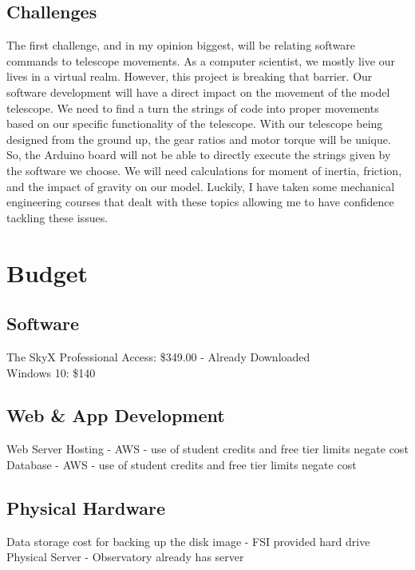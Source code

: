 \documentclass[12pt]{report}
\begin{document}
\clearpage

\subsection*{Challenges}

The first challenge, and in my opinion biggest, will be relating software commands to telescope movements. As a computer scientist, we mostly live our lives in a virtual realm. However, this project is breaking that barrier. Our software development will have a direct impact on the movement of the model telescope. We need to find a turn the strings of code into proper movements based on our specific functionality of the telescope. With our telescope being designed from the ground up, the gear ratios and motor torque will be unique. So, the Arduino board will not be able to directly execute the strings given by the software we choose. We will need calculations for moment of inertia, friction, and the impact of gravity on our model. Luckily, I have taken some mechanical engineering courses that dealt with these topics allowing me to have confidence tackling these issues.

\section*{Budget}

\subsection*{Software}
The SkyX Professional Access: \$349.00 - Already Downloaded\\
Windows 10: \$140

\subsection*{Web \& App Development}
Web Server Hosting - AWS - use of student credits and free tier limits negate cost\\
Database - AWS - use of student credits and free tier limits negate cost

\subsection*{Physical Hardware}

Data storage cost for backing up the disk image - FSI provided hard drive\\
Physical Server - Observatory already has server
\end{document}
